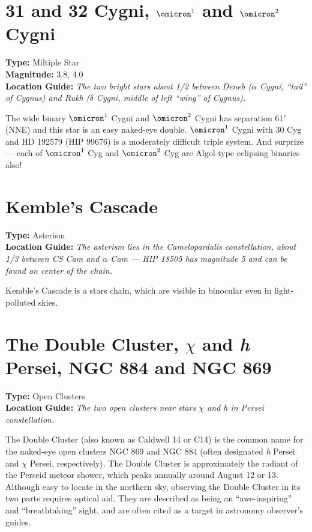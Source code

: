 \section{31 and 32 Cygni, \texorpdfstring{$\omicron^1$ and $\omicron^2$}{omicron1 and omicron2} Cygni}
\textbf{Type:} Miltiple Star \\
\textbf{Magnitude:} 3.8, 4.0 \\
\textbf{Location Guide:} \textit{The two bright stars about 1/2 between Deneb ($\alpha$ Cygni, ``tail'' of Cygnus) and Rukh ($\delta$ Cygni, middle of left ``wing'' of Cygnus).}

The wide binary $\omicron^1$ Cygni and $\omicron^2$ Cygni has separation 61$'$ (NNE) and this star is an easy naked-eye double. $\omicron^1$ Cygni with 30 Cyg and HD 192579 (HIP 99676) is a moderately difficult triple system. And surprize --- each of $\omicron^1$ Cyg and $\omicron^2$ Cyg are Algol-type eclipsing binaries also!

\section{Kemble's Cascade}
\textbf{Type:} Asterism \\
\textbf{Location Guide:} \textit{The asterism lies in the Camelopardalis constellation, about 1/3 between CS Cam and $\alpha$ Cam --- HIP 18505 has magnitude 5 and can be found on center of the chain.}

Kemble's Cascade is a stars chain, which are visible in binocular even in light-polluted skies.

\section{The Double Cluster, \texorpdfstring{$\chi$ and \emph{h}}{chi and h} Persei, NGC 884 and NGC 869}
\textbf{Type:} Open Clusters \\
\textbf{Location Guide:} \textit{The two open clusters near stars $\chi$ and h in Persei constellation.}

The Double Cluster (also known as Caldwell 14 or C14) is the common name for the naked-eye open clusters NGC 869 and NGC 884 (often designated \emph{h} Persei and $\chi$ Persei, respectively). The Double Cluster is approximately the radiant of the Perseid meteor shower, which peaks annually around August 12 or 13. Although easy to locate in the northern sky, observing the Double Cluster in its two parts requires optical aid. They are described as being an ``awe-inspiring'' and ``breathtaking'' sight, and are often cited as a target in astronomy observer's guides.

